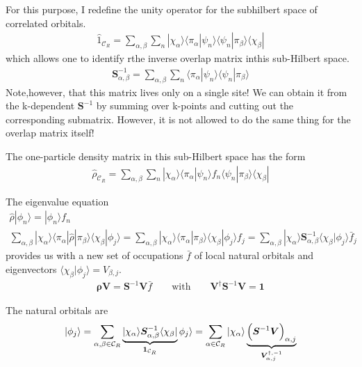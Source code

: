 \documentclass[11pt,a4paper]{report}
\newcommand{\mat}[1]{\bm{#1}}  %
\begin{document}
For this purpose, I redefine the unity operator for the subhilbert
space of correlated orbitals.
\begin{eqnarray}
\hat{1}_{\mathcal{C}_R}
=\sum_{\alpha,\beta}\sum_n
|\chi_\alpha\rangle
\langle\pi_\alpha|\psi_n\rangle\langle\psi_n|\pi_\beta\rangle
\langle\chi_\beta|
\end{eqnarray}
which allows one to identify rthe inverse overlap matrix inthis sub-Hilbert space.
\begin{eqnarray}
\mat{S}^{-1}_{\alpha,\beta}
=\sum_{\alpha,\beta}\sum_n
\langle\pi_\alpha|\psi_n\rangle\langle\psi_n|\pi_\beta\rangle
\end{eqnarray}
Note,however, that this matrix lives only on a single site! We can
obtain it from the k-dependent $\mat{S}^{-1}$ by summing over k-points
and cutting out the corresponding submatrix. However, it is not
allowed to do the same thing for the overlap matrix itself!

The one-particle density matrix in this sub-Hilbert space has the form
\begin{eqnarray}
\hat{\rho}_{\mathcal{C}_R}
=\sum_{\alpha,\beta}\sum_n
|\chi_\alpha\rangle
\langle\pi_\alpha|\psi_n\rangle f_n \langle\psi_n|\pi_\beta\rangle
\langle\chi_\beta|
\end{eqnarray}

The eigenvalue equation
\begin{eqnarray}
\hat{\rho}|\phi_n\rangle=|\phi_n\rangle f_n
\nonumber\\
\sum_{\alpha,\beta}|\chi_\alpha\rangle
\langle\pi_\alpha|\hat{\rho}|\pi_\beta\rangle\langle\chi_\beta|\phi_j\rangle
=\sum_{\alpha,\beta}|\chi_\alpha\rangle\langle\pi_\alpha|\pi_\beta\rangle
\langle\chi_\beta|\phi_j\rangle f_j
=\sum_{\alpha,\beta}|\chi_\alpha\rangle
\mat{S}^{-1}_{\alpha,\beta}\langle\chi_\beta|\phi_j\rangle \bar{f}_j
\end{eqnarray}
provides us with a new set of occupations $\bar{f}$ of local natural
orbitals and eigenvectors
$\langle\chi_\beta|\phi_j\rangle=V_{\beta,j}$.
\begin{eqnarray}
\mat{\rho}\mat{V}=\mat{S}^{-1}\mat{V}\bar{f}
\qquad\text{with}\qquad
\mat{V}^\dagger\mat{S}^{-1}\mat{V}=\mat{1}
\end{eqnarray}

The natural orbitals are
\begin{eqnarray}
|\phi_j\rangle=\sum_{\alpha,\beta\in\mathcal{C}_R}
\underbrace{|\chi_\alpha\rangle
\mat{S}^{-1}_{\alpha,\beta}\langle\chi_\beta|}_{\mat{1}_{\mathcal{C}_R}}
\phi_j\rangle
=\sum_{\alpha\in\mathcal{C}_R}|\chi_\alpha\rangle
\underbrace{\Bigl(\mat{S}^{-1}\mat{V}\Bigr)_{\alpha,j}}_{\mat{V}^{\dagger,-1}_{\alpha,j}}
\end{eqnarray}
\end{document}

